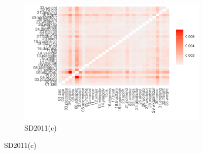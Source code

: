 \begin{figure}[ht]
  \begin{subfigure}{0.75\textwidth}
    \includegraphics[width=\linewidth]{../graphs/synthpop/synthpop_fidelity_twoway_sd2011_clean_small.pdf}
    \caption{SD2011(c)}
    \label{fig:synthpop_fidelity_two_way_subfig-c}
  \end{subfigure}

\end{figure}

